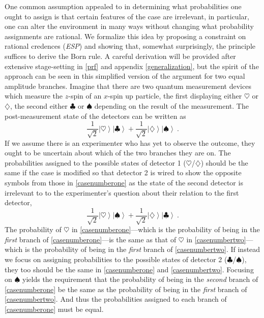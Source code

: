 \documentclass[12pt,onecolumn,secnumarabic,amsmath,amssymb,balancelastpage,nofootinbib]{article}
\newcommand{\ket}[1]{\ensuremath{\left|#1\right\rangle}}
\begin{document}
One common assumption appealed to in determining what probabilities one ought to assign is that certain features of the case are irrelevant, in particular, one can alter the environment in many ways without changing what probability assignments are rational.  We formalize this idea by proposing a constraint on rational credences (\emph{ESP}) and showing that, somewhat surprisingly, the principle suffices to derive the Born rule.  A careful derivation will be provided after extensive stage-setting in \textsection \ref{prf} and appendix \ref{generalization}, but the spirit of the approach can be seen in this simplified version of the argument for two equal amplitude branches.  Imagine that there are two quantum measurement devices which measure the $z$-spin of an $x$-spin up particle, the first displaying either $\heartsuit$ or $\diamondsuit$, the second either $\clubsuit$ or $\spadesuit$ depending on the result of the measurement.  The post-measurement state of the detectors can be written as
\begin{equation}
\frac{1}{\sqrt{2}}\ket{\heartsuit}\ket{\clubsuit}+\frac{1}{\sqrt{2}}\ket{\diamondsuit}\ket{\spadesuit}\ .
\label{casenumberone}
\end{equation}
If we assume there is an experimenter who has yet to observe the outcome, they ought to be uncertain about which of the two branches they are on.  The probabilities assigned to the possible states of detector 1 ($\heartsuit$/$\diamondsuit$) should be the same if the case is modified so that detector 2 is wired to show the opposite symbols from those in \eqref{casenumberone} as the state of the second detector is irrelevant to to the experimenter's question about their relation to the first detector,
\begin{equation}
\frac{1}{\sqrt{2}}\ket{\heartsuit}\ket{\spadesuit}+\frac{1}{\sqrt{2}}\ket{\diamondsuit}\ket{\clubsuit}\ .
\label{casenumbertwo}
\end{equation}
The probability of $\heartsuit$ in \eqref{casenumberone}---which is the probability of being in the \emph{first} branch of \eqref{casenumberone}---is the same as that of $\heartsuit$ in \eqref{casenumbertwo}---which is the probability of being in the \emph{first} branch of \eqref{casenumbertwo}.  If instead we focus on assigning probabilities to the possible states of detector 2 ($\clubsuit$/$\spadesuit$), they too should be the same in \eqref{casenumberone} and \eqref{casenumbertwo}.  Focusing on $\spadesuit$ yields the requirement that the probability of being in the \emph{second} branch of \eqref{casenumberone} be the same as the probability of being in the \emph{first} branch of \eqref{casenumbertwo}.  And thus the probabilities assigned to each branch of \eqref{casenumberone} must be equal.
\end{document}
